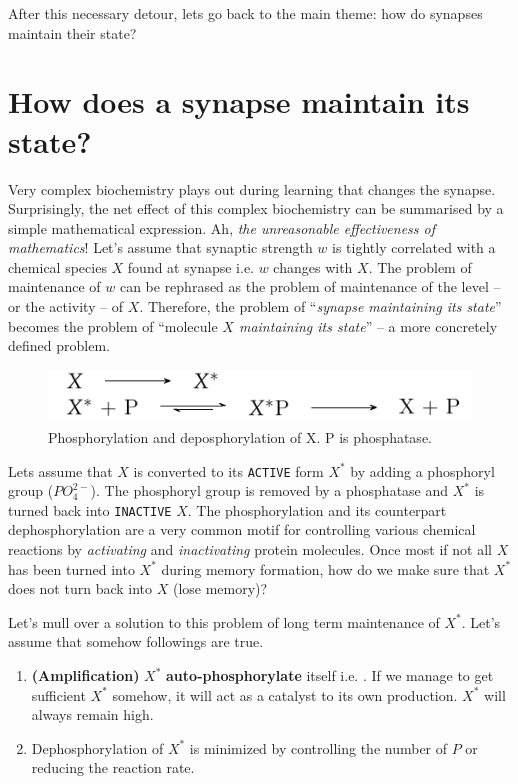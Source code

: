 \documentclass[]{resonance}
\begin{document}
After this necessary detour, lets go back to the main theme: how do synapses
maintain their state?

\section{How does a synapse maintain its state?}

Very complex biochemistry plays out during learning that changes the synapse.
Surprisingly, the net effect of this complex biochemistry can be summarised by a simple
mathematical expression. Ah, \emph{the unreasonable effectiveness of
mathematics}\cite{unreasonable_math}! Let's assume that synaptic strength $w$ is
tightly correlated with a chemical species $X$ found at synapse i.e. $w$ changes
with $X$.  The problem of maintenance of $w$ can be rephrased as the problem of
maintenance of the level -- or the activity -- of $X$. Therefore, the problem of
``\emph{synapse maintaining its state}'' becomes the problem of ``molecule
\emph{$X$ maintaining its state}'' -- a more concretely defined problem.

\begin{figure}[h!]
    \caption{Phosphorylation and deposphorylation of X. P is phosphatase.}\label{fig:model}
    \includegraphics[]{./fig_model.pdf}
\end{figure}

Lets assume that $X$ is converted to its \texttt{ACTIVE} form $X^*$  by adding a
phosphoryl group ($PO_4^{2-}$). The phosphoryl group is removed by a phosphatase
and $X^*$ is turned back into \texttt{INACTIVE} $X$. The phosphorylation and its
counterpart dephosphorylation are a very common motif for controlling various
chemical reactions by \textit{activating} and \textit{inactivating} protein
molecules. Once most if not all $X$ has been turned into $X^*$ during
memory formation, how do we make sure that $X^*$ does not turn back into $X$
(lose memory)?

Let's mull over a solution to this problem of long term maintenance of $X^*$.
Let's assume that somehow followings are true. 
\begin{enumerate}
    \item \textbf{(Amplification)} $X^*$ \textbf{auto-phosphorylate} itself i.e. . If we manage to get sufficient $X^*$ somehow, it
        will act as a catalyst to its own production. $X^*$ will always remain
        high.
    \item Dephosphorylation of $X^*$ is minimized by controlling the number of
        $P$ or reducing the reaction rate.
\end{enumerate} 
\end{document}
